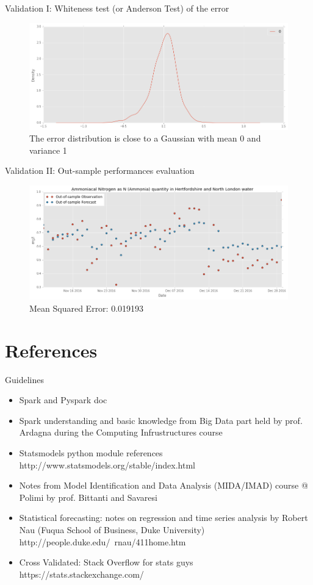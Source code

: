 \documentclass[british]{beamer}
\begin{document}
\begin{frame}{Validation I: Whiteness test (or Anderson Test) of the error}
	\begin{figure}
		\includegraphics[width=\linewidth]{./Imgs/whiteness.png}
		\caption{The error distribution is close to a Gaussian with mean 0 and variance 1}
	\end{figure}
\end{frame}

\begin{frame}{Validation II: Out-sample performances evaluation}
		\begin{figure}
			\includegraphics[width=\linewidth]{./Imgs/validation.png}
			\caption{Mean Squared Error: 0.019193}
		\end{figure}
\end{frame}
		
\section{References}

\begin{frame}{Guidelines}
	\begin{itemize}
		\item Spark and Pyspark doc
		\item Spark understanding and basic knowledge from Big Data part held by prof. Ardagna during the Computing Infrustructures course
		\item Statsmodels python module references http://www.statsmodels.org/stable/index.html
		\item Notes from Model Identification and Data Analysis (MIDA/IMAD) course @ Polimi by prof. Bittanti and Savaresi
		\item Statistical forecasting: notes on regression and time series analysis by Robert Nau (Fuqua School of Business, Duke University) http://people.duke.edu/~rnau/411home.htm
		\item Cross Validated: Stack Overflow for stats guys https://stats.stackexchange.com/
	\end{itemize}
\end{frame}
\end{document}
